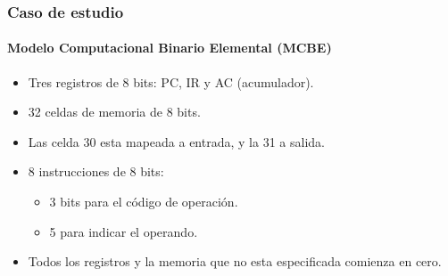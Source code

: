 \documentclass[11pt,a4paper,spanish]{beamer}
\begin{document}
\begin{frame}
    \frametitle{Caso de estudio}
    \framesubtitle{Modelo Computacional Binario Elemental (MCBE)}
    \begin{itemize}
        \item Tres registros de 8 bits: PC, IR y AC (acumulador).
        \item 32 celdas de memoria de 8 bits.
        \item Las celda 30 esta mapeada a entrada, y la 31 a salida.
        \item 8 instrucciones de 8 bits:
            \begin{itemize}
                \item 3 bits para el código de operación.
                \item 5 para indicar el operando.
            \end{itemize}
        \item Todos los registros y la memoria que no esta especificada
            comienza en cero.
    \end{itemize}
\end{frame}
\end{document}
